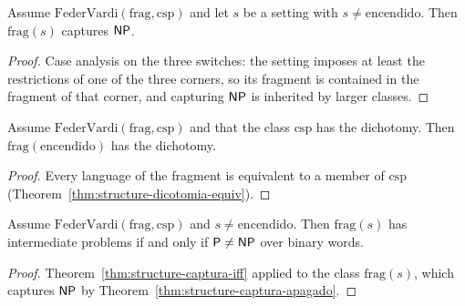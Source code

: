 \begin{theorem}
  \label{thm:structure-captura-apagado}
  \leanok
  Assume $\mathrm{FederVardi}(\mathrm{frag}, \mathrm{csp})$ and let $s$ be a setting with $s \neq
  \mathrm{encendido}$. Then $\mathrm{frag}(s)$ captures $\mathsf{NP}$.
  \own{}
\end{theorem}

\begin{proof}
  \leanok
  Case analysis on the three switches: the setting imposes at least the restrictions of one of the
  three corners, so its fragment is contained in the fragment of that corner, and capturing $\mathsf{NP}$ is
  inherited by larger classes.
\end{proof}

\begin{theorem}
  \label{thm:structure-encendido-dicotomia}
  \leanok
  Assume $\mathrm{FederVardi}(\mathrm{frag}, \mathrm{csp})$ and that the class $\mathrm{csp}$ has the
  dichotomy. Then $\mathrm{frag}(\mathrm{encendido})$ has the dichotomy.
  \own{}
\end{theorem}

\begin{proof}
  \leanok
  Every language of the fragment is equivalent to a member of $\mathrm{csp}$
  (Theorem~\ref{thm:structure-dicotomia-equiv}).
\end{proof}

\begin{theorem}
  \label{thm:structure-apagado-iff}
  \leanok
  Assume $\mathrm{FederVardi}(\mathrm{frag}, \mathrm{csp})$ and $s \neq \mathrm{encendido}$. Then
  $\mathrm{frag}(s)$ has intermediate problems if and only if $\mathsf{P} \neq \mathsf{NP}$ over binary words.
  \own{}
\end{theorem}

\begin{proof}
  \leanok
  Theorem~\ref{thm:structure-captura-iff} applied to the class $\mathrm{frag}(s)$, which captures
  $\mathsf{NP}$ by Theorem~\ref{thm:structure-captura-apagado}.
\end{proof}

